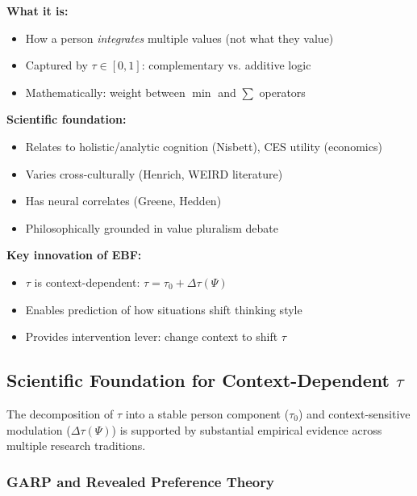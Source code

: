 \begin{tcolorbox}[
  colback=blue!3,
  colframe=blue!50!black,
  title={\textbf{Thinking Style: Key Points}},
  fonttitle=\bfseries\sffamily
]

\textbf{What it is:}
\begin{itemize}
\item How a person \textit{integrates} multiple values (not what they value)
\item Captured by $\tau \in [0,1]$: complementary vs. additive logic
\item Mathematically: weight between $\min$ and $\sum$ operators
\end{itemize}

\textbf{Scientific foundation:}
\begin{itemize}
\item Relates to holistic/analytic cognition (Nisbett), CES utility (economics)
\item Varies cross-culturally (Henrich, WEIRD literature)
\item Has neural correlates (Greene, Hedden)
\item Philosophically grounded in value pluralism debate
\end{itemize}

\textbf{Key innovation of EBF:}
\begin{itemize}
\item $\tau$ is context-dependent: $\tau = \tau_0 + \Delta\tau(\Psi)$
\item Enables prediction of how situations shift thinking style
\item Provides intervention lever: change context to shift $\tau$
\end{itemize}

\end{tcolorbox}



\subsection{Scientific Foundation for Context-Dependent $\tau$}
\label{sec:tau-scientific}

The decomposition of $\tau$ into a stable person component ($\tau_0$) and context-sensitive modulation ($\Delta\tau(\Psi)$) is supported by substantial empirical evidence across multiple research traditions.

\subsubsection{GARP and Revealed Preference Theory}

